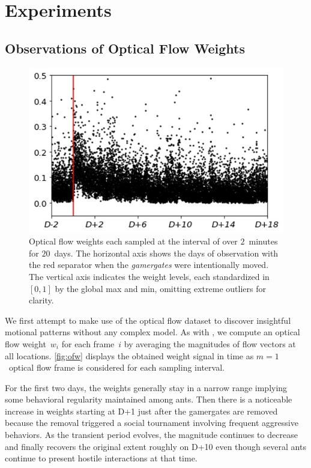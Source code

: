\documentclass[letterpaper]{article} %
\let\orgautoref\autoref
\providecommand{\Autoref}
{\def\equationautorefname{Equation}%
\def\figureautorefname{Figure}%
\def\subfigureautorefname{Figure}%
\def\Itemautorefname{Item}%
\def\tableautorefname{Table}%
\def\exerciseautorefname{Exercise}%
\def\starexerciseautorefname{Exercise}%
\def\sectionautorefname{Section}%
\def\subsectionautorefname{Section}%
\def\subsubsectionautorefname{Section}%
\def\chapterautorefname{Section}%
\def\partautorefname{Part}%
\orgautoref}
\renewcommand{\autoref}
{\def\equationautorefname{Equation}%
\def\figureautorefname{Fig.}%
\def\subfigureautorefname{Fig.}%
\def\Itemautorefname{item}%
\def\tableautorefname{Table}%
\def\exerciseautorefname{Exercise}%
\def\starexerciseautorefname{Exercise}%
\def\sectionautorefname{Section}%
\def\subsectionautorefname{Section}%
\def\subsubsectionautorefname{Section}%
\def\chapterautorefname{Section}%
\def\partautorefname{Part}%
\orgautoref}
\begin{document}
\section{Experiments}
\label{sec:experiments}


\subsection{Observations of Optical Flow Weights}
\label{sec:obs_optical_flow_weights}

\begin{figure}[t]
\centering
\includegraphics[width=.7\columnwidth]{ofw}
\caption{
Optical flow weights each sampled at the interval of
over $2$~minutes for $20$~days.
The horizontal axis shows the days of observation
with the red separator
when the \emph{gamergates} were intentionally moved.
The vertical axis indicates the weight levels, each
standardized in $[0, 1]$ by the global max and
min, omitting extreme outliers for clarity.
}
\label{fig:ofw}
\end{figure}
We first attempt to make use of the optical flow dataset to discover
insightful motional patterns without any complex model. As with
\citet{MCFT13}, we compute an optical flow weight~$w_i$ for each
frame~$i$ by averaging the magnitudes of flow vectors at all locations.
\Autoref{fig:ofw} displays the obtained weight signal in time as
$m=1$~optical flow frame is considered for each sampling interval.

For the first two days, the weights generally stay in a narrow range
implying some behavioral regularity maintained among ants. Then there is
a noticeable increase in weights starting at D+1 just after the gamergates
are removed because the removal triggered a social
tournament involving frequent aggressive behaviors. As the
transient period evolves, the magnitude continues to decrease and
finally recovers the original extent roughly on D+10 even though
several ants continue to present hostile interactions at that time.
\end{document}
